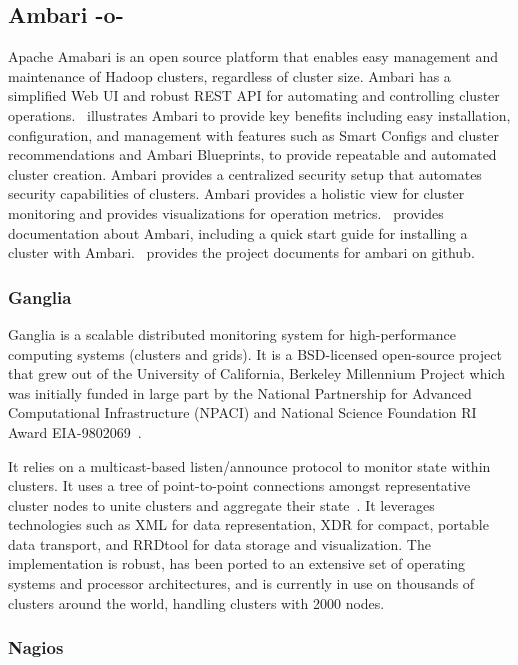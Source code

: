 \subsection{Ambari -o-}

Apache Amabari is an open source platform that enables easy management
and maintenance of Hadoop clusters, regardless of cluster size. Ambari
has a simplified Web UI and robust REST API for automating and
controlling cluster operations.~\cite{www-hortonworks-ambari}
illustrates Ambari to provide key benefits including easy
installation, configuration, and management with features such as
Smart Configs and cluster recommendations and Ambari Blueprints, to
provide repeatable and automated cluster creation. Ambari provides a
centralized security setup that automates security capabilities of
clusters. Ambari provides a holistic view for cluster monitoring and
provides visualizations for operation metrics.~\cite{www-ambari}
provides documentation about Ambari, including a quick start guide for
installing a cluster with Ambari.~\cite{www-github-ambari} provides
the project documents for ambari on github.
     
\subsubsection{Ganglia}

Ganglia is a scalable distributed monitoring system for
high-performance computing systems (clusters and grids). It is a
BSD-licensed open-source project that grew out of the University of
California, Berkeley Millennium Project which was initially funded in
large part by the National Partnership for Advanced Computational
Infrastructure (NPACI) and National Science Foundation RI Award
EIA-9802069~\cite{www-gms}.

It relies on a multicast-based listen/announce protocol to monitor
state within clusters. It uses a tree of point-to-point connections
amongst representative cluster nodes to unite clusters and aggregate
their state~\cite{www-gsoft}. It leverages technologies such as XML
for data representation, XDR for compact, portable data transport, and
RRDtool for data storage and visualization. The implementation is
robust, has been ported to an extensive set of operating systems and
processor architectures, and is currently in use on thousands of
clusters around the world, handling clusters with 2000 nodes.
     
\subsubsection{Nagios~\cite{www-nagios -o-}}

